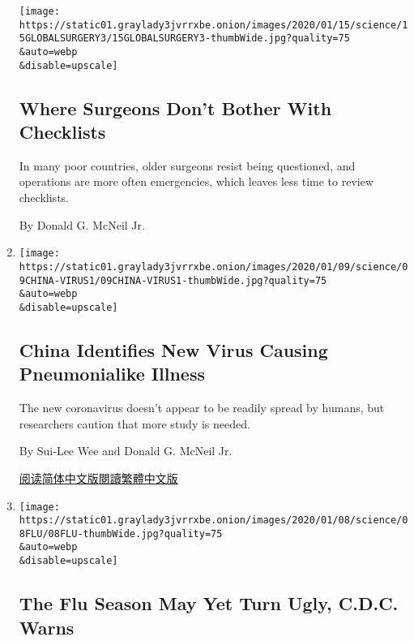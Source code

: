\begin{enumerate}
  \texttt{[image: https://static01.graylady3jvrrxbe.onion/images/2020/01/15/science/15GLOBALSURGERY3/15GLOBALSURGERY3-thumbWide.jpg?quality=75\\\&auto=webp\\\&disable=upscale]}

  \hypertarget{where-surgeons-dont-bother-with-checklists}{%
  \subsection{Where Surgeons Don't Bother With
  Checklists}\label{where-surgeons-dont-bother-with-checklists}}

  In many poor countries, older surgeons resist being questioned, and
  operations are more often emergencies, which leaves less time to
  review checklists.

  By Donald G. McNeil Jr.
\item
  \href{/2020/01/08/health/china-pneumonia-outbreak-virus.html}{}

  \texttt{[image: https://static01.graylady3jvrrxbe.onion/images/2020/01/09/science/09CHINA-VIRUS1/09CHINA-VIRUS1-thumbWide.jpg?quality=75\\\&auto=webp\\\&disable=upscale]}

  \hypertarget{china-identifies-new-virus-causing-pneumonialike-illness}{%
  \subsection{China Identifies New Virus Causing Pneumonialike
  Illness}\label{china-identifies-new-virus-causing-pneumonialike-illness}}

  The new coronavirus doesn't appear to be readily spread by humans, but
  researchers caution that more study is needed.

  By Sui-Lee Wee and Donald G. McNeil Jr.

  \href{https://cn.nytimes3xbfgragh.onion/china/20200109/china-pneumonia-outbreak-virus/}{阅读简体中文版}\href{https://cn.nytimes3xbfgragh.onion/china/20200109/china-pneumonia-outbreak-virus/zh-hn}{閱讀繁體中文版}
\item
  \href{/2020/01/08/health/flu-season-severity.html}{}

  \texttt{[image: https://static01.graylady3jvrrxbe.onion/images/2020/01/08/science/08FLU/08FLU-thumbWide.jpg?quality=75\\\&auto=webp\\\&disable=upscale]}

  \hypertarget{the-flu-season-may-yet-turn-ugly-cdc-warns}{%
  \subsection{The Flu Season May Yet Turn Ugly, C.D.C.
  Warns}\label{the-flu-season-may-yet-turn-ugly-cdc-warns}}


\end{enumerate}
